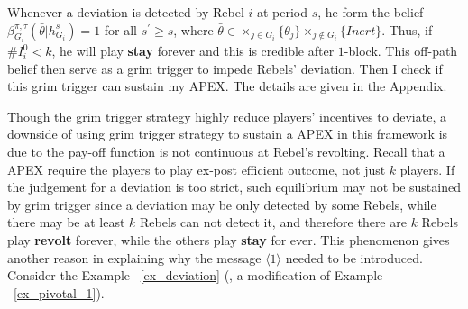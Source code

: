 \documentclass[12pt,letter]{article}
\theoremstyle{definition}
\theoremstyle{remark}
\theoremstyle{claim}
\begin{document}
Whenever a deviation is detected by Rebel $i$ at period $s$, he form the belief $\beta^{\pi,\tau}_{G_i}(\bar{\theta}|h^{s}_{G_i})=1$ for all $s^{'}\geq s$, where $\bar{\theta}\in\times_{j\in G_i}\{\theta_j\}\times_{j\notin G_i}\{Inert\}$. Thus, if $\# I^0_i<k$, he will play \textbf{stay} forever and this is credible after $1$-block. This off-path belief then serve as a grim trigger to impede Rebels' deviation. Then I check if this grim trigger can sustain my APEX. The details are given in the Appendix.

Though the grim trigger strategy highly reduce players' incentives to deviate, a downside of using grim trigger strategy to sustain a APEX in this framework is due to the pay-off function is not continuous at Rebel's revolting. Recall that a APEX require  the players to play ex-post efficient outcome, not just $k$ players. If the judgement for a deviation is too strict, such equilibrium may not be sustained by grim trigger since a deviation may be only detected by some Rebels, while there may be at least $k$ Rebels can not detect it, and therefore there are $k$ Rebels play \textbf{revolt} forever, while the others play \textbf{stay} for ever. This phenomenon gives another reason in explaining why the message $\langle 1 \rangle$ needed to be introduced. Consider the Example ~\ref{ex_deviation} (, a modification of Example ~\ref{ex_pivotal_1}).
\end{document}
